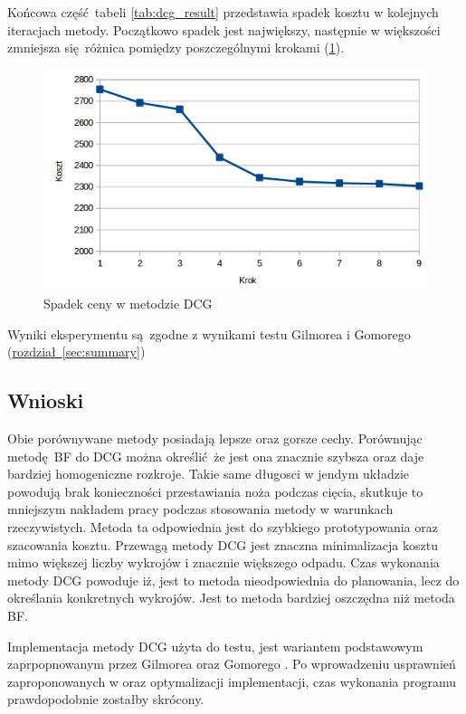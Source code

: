 Końcowa część tabeli \ref{tab:dcg_result} przedstawia spadek kosztu w kolejnych iteracjach metody. Początkowo spadek jest największy, następnie w większości zmniejsza się różnica pomiędzy poszczególnymi krokami (\ref{fig:regression}).

\begin{figure}[h]
  \includegraphics[width=\textwidth]{../image/dcg_regression.png}
  \caption{Spadek ceny w metodzie DCG}
  \label{fig:regression}
\end{figure}

Wyniki eksperymentu są zgodne z wynikami testu Gilmorea i Gomorego (\hyperref[sec:dcg]{rozdział~\ref*{sec:summary}})

\subsection{Wnioski}
Obie porównywane metody posiadają lepsze oraz gorsze cechy. Porównując metodę BF do DCG można określić że jest ona znacznie szybsza oraz daje bardziej homogeniczne rozkroje. Takie same długosci w jendym układzie powodują brak konieczności przestawiania noża podczas cięcia, skutkuje to mniejszym nakładem pracy podczas stosowania metody w warunkach rzeczywistych. Metoda ta odpowiednia jest do szybkiego prototypowania oraz szacowania kosztu. Przewagą metody DCG jest znaczna minimalizacja kosztu mimo większej liczby wykrojów i znacznie większego odpadu. Czas wykonania metody DCG powoduje iż, jest to metoda nieodpowiednia do planowania, lecz do określania konkretnych wykrojów. Jest to metoda bardziej oszczędna niż metoda BF.

Implementacja metody DCG użyta do testu, jest wariantem podstawowym zaprpopnowanym przez Gilmorea oraz Gomorego \cite{GilmoreGomoryV1Article}. Po wprowadzeniu usprawnień zaproponowanych w \cite{GilmoreGomoryV2Article} oraz optymalizacji implementacji, czas wykonania programu prawdopodobnie zostałby skrócony.
